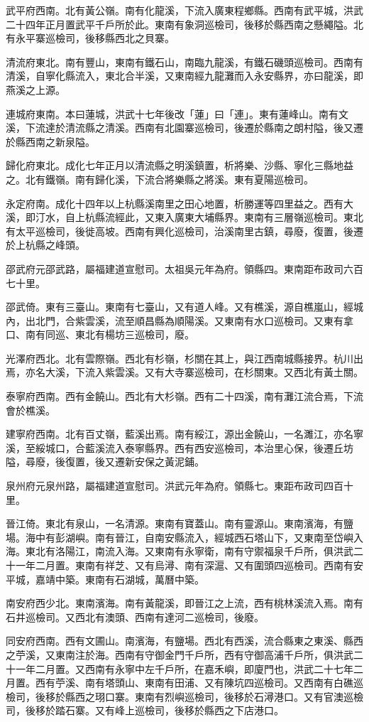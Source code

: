 武平府西南。北有黃公嶺。南有化龍溪，下流入廣東程鄉縣。西南有武平城，洪武二十四年正月置武平千戶所於此。東南有象洞巡檢司，後移於縣西南之懸繩隘。北有永平寨巡檢司，後移縣西北之貝寨。

清流府東北。南有豐山，東南有鐵石山，南臨九龍溪，有鐵石磯頭巡檢司。西南有清溪，自寧化縣流入，東北合半溪，又東南經九龍灘而入永安縣界，亦曰龍溪，即燕溪之上源。

連城府東南。本曰蓮城，洪武十七年後改「蓮」曰「連」。東有蓮峰山。南有文溪，下流達於清流縣之清溪。西南有北園寨巡檢司，後遷於縣南之朗村隘，後又遷於縣西南之新泉隘。

歸化府東北。成化七年正月以清流縣之明溪鎮置，析將樂、沙縣、寧化三縣地益之。北有鐵嶺。南有歸化溪，下流合將樂縣之將溪。東有夏陽巡檢司。

永定府南。成化十四年以上杭縣溪南里之田心地置，析勝運等四里益之。西有大溪，即汀水，自上杭縣流經此，又東入廣東大埔縣界。東南有三層嶺巡檢司。東北有太平巡檢司，後徙高坡。西南有興化巡檢司，治溪南里古鎮，尋廢，復置，後遷於上杭縣之峰頭。

邵武府元邵武路，屬福建道宣慰司。太祖吳元年為府。領縣四。東南距布政司六百七十里。

邵武倚。東有三臺山。東南有七臺山，又有道人峰。又有樵溪，源自樵嵐山，經城內，出北門，合紫雲溪，流至順昌縣為順陽溪。又東南有水口巡檢司。又東有拿口、南有同巡、東北有楊坊三巡檢司，廢。

光澤府西北。北有雲際嶺。西北有杉嶺，杉關在其上，與江西南城縣接界。杭川出焉，亦名大溪，下流入紫雲溪。又有大寺寨巡檢司，在杉關東。又西北有黃土關。

泰寧府西南。西有金饒山。西北有大杉嶺。西有二十四溪，南有灘江流合焉，下流會於樵溪。

建寧府西南。北有百丈嶺，藍溪出焉。南有綏江，源出金饒山，一名濉江，亦名寧溪，至綏城口，合藍溪流入泰寧縣界。西有西安巡檢司，本治里心保，後遷丘坊隘，尋廢，後復置，後又遷新安保之黃泥鋪。

泉州府元泉州路，屬福建道宣慰司。洪武元年為府。領縣七。東距布政司四百十里。

晉江倚。東北有泉山，一名清源。東南有寶蓋山。南有靈源山。東南濱海，有鹽場。海中有彭湖嶼。南有晉江，自南安縣流入，經城西石塔山下，又東南至岱嶼入海。東北有洛陽江，南流入海。又東南有永寧衛，南有守禦福泉千戶所，俱洪武二十一年二月置。東南有祥芝、又有烏潯、南有深滬、又有圍頭四巡檢司。西南有安平城，嘉靖中築。東南有石湖城，萬曆中築。

南安府西少北。東南濱海。南有黃龍溪，即晉江之上流，西有桃林溪流入焉。南有石井巡檢司。又西北有澳頭、西南有達河二巡檢司，後廢。

同安府西南。西有文圃山。南濱海，有鹽場。西北有西溪，流合縣東之東溪、縣西之苧溪，又東南注於海。西南有守御金門千戶所，西有守御高浦千戶所，俱洪武二十一年二月置。又西南有永寧中左千戶所，在嘉禾嶼，即廈門也，洪武二十七年二月置。西有苧溪、南有塔頭山、東南有田浦、又有陳坑四巡檢司。又西南有白礁巡檢司，後移於縣西之珝口寨。東南有烈嶼巡檢司，後移於石潯港口。又有官澳巡檢司，後移於踏石寨。又有峰上巡檢司，後移於縣西之下店港口。

